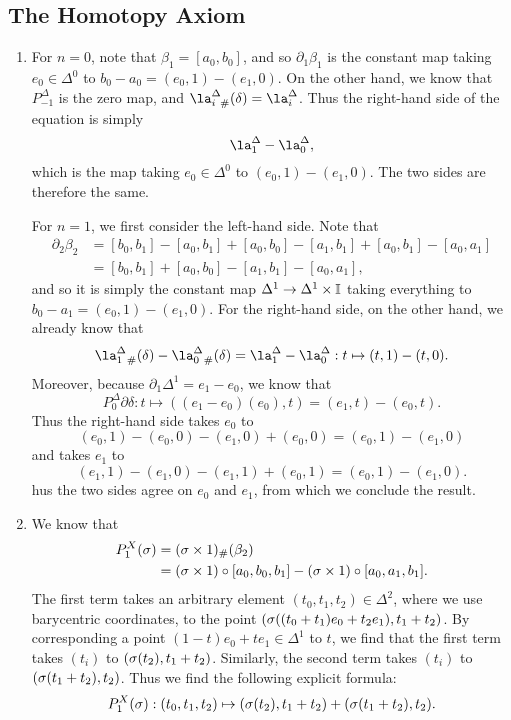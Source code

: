 \documentclass[../../solutions.tex]{subfiles}
\begin{document}
\subsection{The Homotopy Axiom}
\begin{exercise} \leavevmode
\begin{enumerate}
\item For $n=0$, note that $\beta_1=[a_0,b_0]$, and so $\partial_1\beta_1$ is the constant map taking $e_0\in\Delta^0$ to $b_0-a_0=(e_0,1)-(e_1,0)$. 
On the other hand, we know that $P_{-1}^\Delta$ is the zero map, and $\la_{i~\#}^\Delta(\delta)=\la_i^\Delta$. 
Thus the right-hand side of the equation is simply \[\la_1^\Delta-\la_0^\Delta,\] which is the map taking $e_0\in\Delta^0$ to $(e_0,1)-(e_1,0)$. 
The two sides are therefore the same. 

For $n=1$, we first consider the left-hand side. 
Note that \begin{align*}\partial_2\beta_2&=[b_0,b_1]-[a_0,b_1]+[a_0,b_0]-[a_1,b_1]+[a_0,b_1]-[a_0,a_1]\\&=[b_0,b_1]+[a_0,b_0]-[a_1,b_1]-[a_0,a_1],\end{align*} and so it is simply the constant map $\Delta^1\to\Delta^1\times\mathbb I$ taking everything to $b_0-a_1=(e_0,1)-(e_1,0)$. 
For the right-hand side, on the other hand, we already know that \[\la_{1~\#}^\Delta(\delta)-\la_{0~\#}^\Delta(\delta)=\la_1^\Delta-\la_0^\Delta:t\mapsto(t,1)-(t,0).\] 
Moreover, because $\partial_1\Delta^1=e_1-e_0$, we know that \[P_0^\Delta\partial\delta:t\mapsto((e_1-e_0)(e_0),t)=(e_1,t)-(e_0,t).\] 
Thus the right-hand side takes $e_0$ to \[(e_0,1)-(e_0,0)-(e_1,0)+(e_0,0)=(e_0,1)-(e_1,0)\] and takes $e_1$ to \[(e_1,1)-(e_1,0)-(e_1,1)+(e_0,1)=(e_0,1)-(e_1,0).\] 
hus the two sides agree on $e_0$ and $e_1$, from which we conclude the result. 

\item We know that \begin{align*}P_1^X(\sigma)&=(\sigma\times1)_\#(\beta_2)\\&=(\sigma\times1)\circ[a_0,b_0,b_1]-(\sigma\times1)\circ[a_0,a_1,b_1].\end{align*} 
The first term takes an arbitrary element $(t_0,t_1,t_2)\in\Delta^2$, where we use barycentric coordinates, to the point $(\sigma((t_0+t_1)e_0+t_2e_1),t_1+t_2)$. 
By corresponding a point $(1-t)e_0+te_1\in\Delta^1$ to $t$, we find that the first term takes $(t_i)$ to $(\sigma(t_2),t_1+t_2)$. 
Similarly, the second term takes $(t_i)$ to $(\sigma(t_1+t_2),t_2)$. 
Thus we find the following explicit formula: \[P_1^X(\sigma):(t_0,t_1,t_2)\mapsto(\sigma(t_2),t_1+t_2)+(\sigma(t_1+t_2),t_2).\]
\end{enumerate}
\end{exercise}
\end{document}
